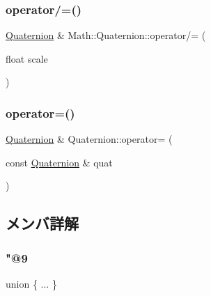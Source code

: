 \mbox{\label{struct_math_1_1_quaternion_a2157dd9798f538ebd2463cd962c11a64}} 
\subsubsection{\texorpdfstring{operator/=()}{operator/=()}\hspace{0.1cm}{\footnotesize\ttfamily [2/2]}}
{\footnotesize\ttfamily \mbox{\hyperlink{struct_math_1_1_quaternion}{Quaternion}} \& Math\+::\+Quaternion\+::operator/= (\begin{DoxyParamCaption}\item[{float}]{scale }\end{DoxyParamCaption})}

\mbox{\label{struct_math_1_1_quaternion_acb64d4da834f6bc8f2cdcbd5525c05d4}} 
\subsubsection{\texorpdfstring{operator=()}{operator=()}}
{\footnotesize\ttfamily \mbox{\hyperlink{struct_math_1_1_quaternion}{Quaternion}} \& Quaternion\+::operator= (\begin{DoxyParamCaption}\item[{const \mbox{\hyperlink{struct_math_1_1_quaternion}{Quaternion}} \&}]{quat }\end{DoxyParamCaption})}



\subsection{メンバ詳解}
\mbox{\label{struct_math_1_1_quaternion_a09449d4fc06ef23c17f363910edf0c5a}} 
\subsubsection{\texorpdfstring{"@9}{@9}}
{\footnotesize\ttfamily union \{ ... \} }

\mbox{\label{struct_math_1_1_quaternion_a628a90b817e19edde055fc4745e25f5c}} 

